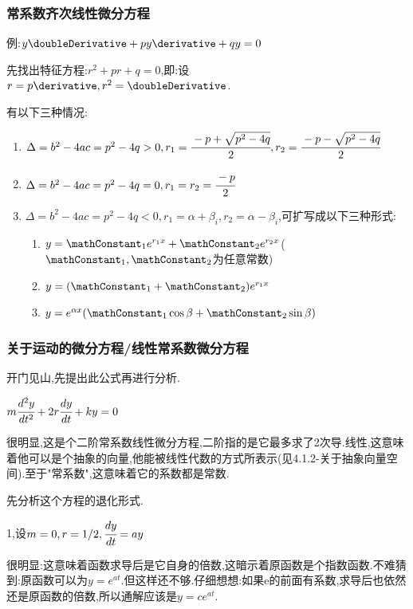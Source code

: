 {{{}%

\subsubsection{常系数齐次线性微分方程}{
  例:$y\doubleDerivative + py\derivative + qy = 0$

  先找出特征方程:$r^2 + pr + q = 0$,即:设$r = p\derivative,r^2 = \doubleDerivative$.

  有以下三种情况:
  \begin{enumerate}
    \item $\Delta = b^2 - 4ac = p^2 - 4q > 0,r_1 = \cfrac{-p + \sqrt{p^2 - 4q}}{2}, r_2 = \cfrac{-p - \sqrt{p^2 - 4q}}{2}$
    \item $\Delta = b^2 - 4ac = p^2 - 4q = 0,r_1 = r_2 = \cfrac{-p}{2}$
    \item {$\Delta = b^2 - 4ac = p^2 - 4q < 0,r_1 = \alpha + \beta_i, r_2 = \alpha - \beta_i$,可扩写成以下三种形式:

          \begin{enumerate}
            \item $y = \mathConstant_1e^{r_1x} + \mathConstant_2e^{r_2x}$($\mathConstant_1,\mathConstant_2$为任意常数)
            \item $y = (\mathConstant_1 + \mathConstant_2)e^{r_1x}$
            \item $y = e^{\alpha x}(\mathConstant_1\cos\beta + \mathConstant_2\sin\beta)$
          \end{enumerate}
          }
  \end{enumerate}

}%

\subsubsection{关于运动的微分方程/线性常系数微分方程}{
开门见山,先提出此公式再进行分析.

$m\cfrac{d^2y}{dt^2} + 2r\cfrac{dy}{dt} + ky = 0$

很明显,这是个二阶常系数线性微分方程,二阶指的是它最多求了2次导.线性,这意味着他可以是个抽象的向量,他能被线性代数的方式所表示(见4.1.2-关于抽象向量空间).至于"常系数",这意味着它的系数都是常数.

先分析这个方程的退化形式.

1,设$m = 0, r = 1/2, \cfrac{dy}{dt} = ay$

很明显:这意味着函数求导后是它自身的倍数,这暗示着原函数是个指数函数.不难猜到:原函数可以为$y = e^{at}$.但这样还不够.仔细想想:如果e的前面有系数,求导后也依然还是原函数的倍数,所以通解应该是$y = ce^{at}$.

}}}
